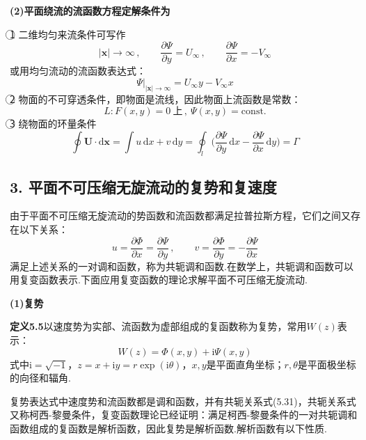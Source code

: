 \textbf{(2)平面绕流的流函数方程定解条件为}

\textcircled{1} 二维均匀来流条件可写作
\begin{equation*}
|\boldsymbol{x}|\to\infty\,,\qquad \frac{\partial\Psi}{\partial y}=U_\infty\,,\qquad \frac{\partial\Psi}{\partial x}=-V_\infty
\tag{5.28a}
\end{equation*}
或用均匀流动的流函数表达式：
\begin{equation*}
\Psi\big|_{|\boldsymbol{x}|\to\infty}=U_\infty y-V_\infty x
\tag{5.28b}
\end{equation*}
\textcircled{2} 物面的不可穿透条件，即物面是流线，因此物面上流函数是常数：
\begin{equation*}
L:F(x,y)=0\ \text{上}\,,\ \Psi(x,y)=\mathrm{const.}
\tag{5.29}
\end{equation*}
\textcircled{3} 绕物面的环量条件
\begin{equation*}
\oint\boldsymbol{U}\cdot\mathrm{d}\boldsymbol{x}=\int u\,\mathrm{d}x+v\,\mathrm{d}y=\oint_l\Big(\frac{\partial\Psi}{\partial y}\,\mathrm{d}x-\frac{\partial\Psi}{\partial x}\,\mathrm{d}y\Big)=\Gamma
\tag{5.30}
\end{equation*}

\subsection*{3. 平面不可压缩无旋流动的复势和复速度}

由于平面不可压缩无旋流动的势函数和流函数都满足拉普拉斯方程，它们之间又存在以下关系：
\begin{equation*}
u=\frac{\partial\Phi}{\partial x}=\frac{\partial\Psi}{\partial y}\,,\qquad v=\frac{\partial\Phi}{\partial y}=-\frac{\partial\Psi}{\partial x}
\tag{5.31}
\end{equation*}
满足上述关系的一对调和函数，称为共轭调和函数.在数学上，共轭调和函数可以用复变函数表示.下面应用复变函数的理论求解平面不可压缩无旋流动.

\textbf{(1)复势}

\noindent\textbf{定义5.5}\quad 以速度势为实部、流函数为虚部组成的复函数称为复势，常用$W(z)$表示：
\begin{equation*}
W(z)=\Phi(x,y)+\mathrm{i}\Psi(x,y)
\tag{5.32}
\end{equation*}
式中$\mathrm{i}=\sqrt{-1}$，$z=x+\mathrm{i}y=r\exp(\mathrm{i}\theta)$，$x,y$是平面直角坐标；$r,\theta$是平面极坐标的向径和辐角.

复势表达式中速度势和流函数都是调和函数，并有共轭关系式(5.31)，共轭关系式又称柯西-黎曼条件，复变函数理论已经证明：满足柯西-黎曼条件的一对共轭调和函数组成的复函数是解析函数，因此复势是解析函数.解析函数有以下性质.

